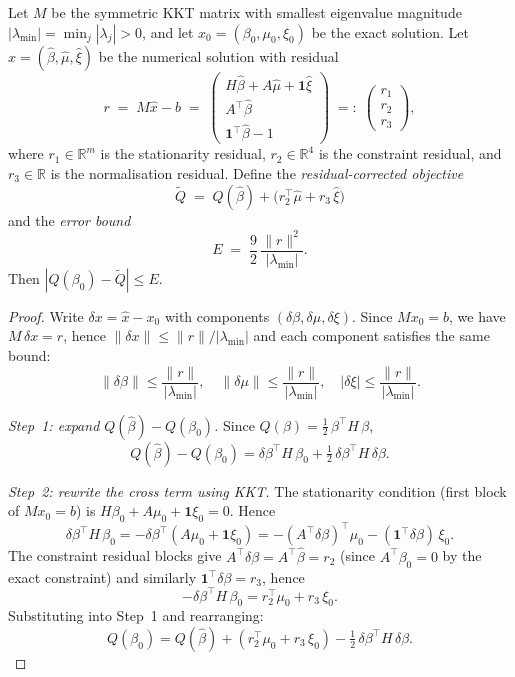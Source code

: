 \begin{unverified}
\begin{lemma}%
\label{lem:q-error-bound}
Let $M$ be the symmetric KKT matrix
with smallest eigenvalue magnitude
$|\lambda_{\min}| = \min_j |\lambda_j| > 0$,
and let $x_0 = (\beta_0, \mu_0, \xi_0)$ be the exact
solution.
Let $\hat x = (\hat\beta, \hat\mu, \hat\xi)$ be the
numerical solution with residual
\[
  r \;=\; M\hat x - b
  \;=\; \begin{pmatrix}
    H\hat\beta + A\hat\mu + \mathbf{1}\hat\xi \\
    A^\top\hat\beta \\
    \mathbf{1}^\top\hat\beta - 1
  \end{pmatrix}
  \;=:\; \begin{pmatrix}r_1 \\ r_2 \\ r_3\end{pmatrix},
\]
where $r_1 \in \mathbb{R}^m$ is the stationarity residual,
$r_2 \in \mathbb{R}^4$ is the constraint residual, and
$r_3 \in \mathbb{R}$ is the normalisation residual.
Define the \emph{residual-corrected objective}
\[
  \tilde Q
  \;=\; Q(\hat\beta)
    + \bigl(r_2^\top\hat\mu + r_3\,\hat\xi\bigr)
\]
and the \emph{error bound}
\[
  E \;=\; \frac{9}{2}\,\frac{\|r\|^2}{|\lambda_{\min}|}.
\]
Then $|Q(\beta_0) - \tilde Q| \leq E$.
\end{lemma}

\begin{proof}
Write $\delta x = \hat x - x_0$ with components
$(\delta\beta, \delta\mu, \delta\xi)$.
Since $M x_0 = b$, we have $M\,\delta x = r$,
hence $\|\delta x\| \leq \|r\| / |\lambda_{\min}|$ and
each component satisfies the same bound:
\[
  \|\delta\beta\| \leq \frac{\|r\|}{|\lambda_{\min}|}, \quad
  \|\delta\mu\| \leq \frac{\|r\|}{|\lambda_{\min}|}, \quad
  |\delta\xi| \leq \frac{\|r\|}{|\lambda_{\min}|}.
\]

\emph{Step~1: expand $Q(\hat\beta) - Q(\beta_0)$.}
Since $Q(\beta) = \tfrac{1}{2}\,\beta^\top H\,\beta$,
\[
  Q(\hat\beta) - Q(\beta_0)
  = \delta\beta^\top H\,\beta_0
    + \tfrac{1}{2}\,\delta\beta^\top H\,\delta\beta.
\]

\emph{Step~2: rewrite the cross term using KKT.}
The stationarity condition (first block of $M x_0 = b$) is
$H\beta_0 + A\mu_0 + \mathbf{1}\xi_0 = 0$.
Hence
\[
  \delta\beta^\top H\,\beta_0
  = -\delta\beta^\top(A\mu_0 + \mathbf{1}\xi_0)
  = -(A^\top\delta\beta)^\top \mu_0
    - (\mathbf{1}^\top\delta\beta)\,\xi_0.
\]
The constraint residual blocks give
$A^\top\delta\beta = A^\top\hat\beta = r_2$
(since $A^\top\beta_0 = 0$ by the exact constraint)
and similarly $\mathbf{1}^\top\delta\beta = r_3$, hence
\[
  -\delta\beta^\top H\,\beta_0
  = r_2^\top\mu_0 + r_3\,\xi_0.
\]
Substituting into Step~1 and rearranging:
\[
  Q(\beta_0) = Q(\hat\beta) + (r_2^\top\mu_0 + r_3\,\xi_0)
    - \tfrac{1}{2}\,\delta\beta^\top H\,\delta\beta.
\]


\end{proof}
\end{unverified}
